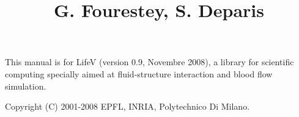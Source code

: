 \documentclass[a4paper, 12pt, report]{lifestyle}
\title{\lifetitle{LifeV Developer Manual}
{G. Fourestey, S. Deparis}
}
\begin{document}
\maketitle

\phantom{dummy text}
\vfill
This manual is for LifeV (version 0.9, Novembre 2008), a library for scientific computing specially aimed at fluid-structure interaction and blood flow simulation.

Copyright (C) 2001-2008 EPFL, INRIA, Polytechnico Di Milano.

\tableofcontents


\listoftables







\printindex
\end{document}

